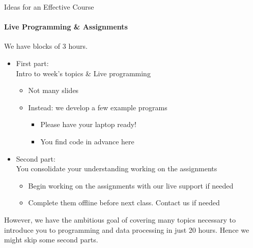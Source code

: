 \documentclass{beamer}%
\begin{document}
\begin{frame}{Ideas for an Effective Course} 
\framesubtitle{Live Programming \& Assignments}
We have blocks of 3 hours.
\begin{itemize}
\item First part: %
\\ Intro to week's topics \& Live programming
    \begin{itemize}
    \item Not many slides
    \item Instead: we develop a few example programs %
      \begin{itemize}
      \item Please have your laptop ready! \myurl{\homepagesetup}
	  \item You find code in advance here %
      \end{itemize}
    \end{itemize}


\item Second part: %
\\ You consolidate your understanding working on the assignments
\begin{itemize}
\item Begin working on the assignments with our live support if needed
\item Complete them offline before next class. Contact us if needed
\end{itemize}
\end{itemize}
\pause
{\color{red}
However, we have the ambitious goal of covering many topics necessary to introduce you to programming and data processing in just 20 hours. Hence we might skip some second parts.
}
\end{frame}





\end{document}
